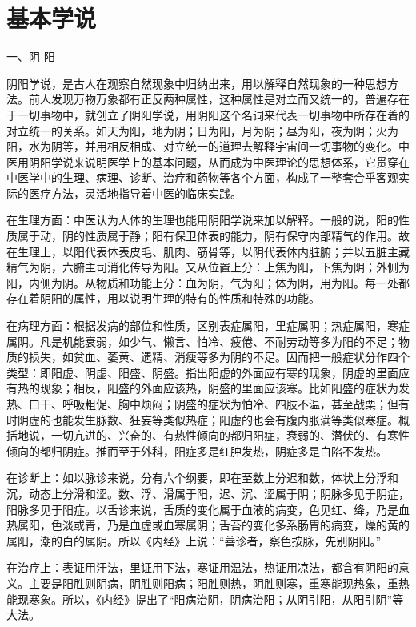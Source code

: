 \documentclass[a4paper,12pt,UTF8,twoside]{ctexbook}
\begin{document}
\section{基本学说}

一、阴 阳

阴阳学说，是古人在观察自然现象中归纳出来，用以解释自然现象的一种思想方法。前人发现万物万象都有正反两种属性，这种属性是对立而又统一的，普遍存在于一切事物中，就创立了阴阳学说，用阴阳这个名词来代表一切事物中所存在着的对立统一的关系。如天为阳，地为阴；日为阳，月为阴；昼为阳，夜为阴；火为阳，水为阴等，并用相反相成、对立统一的道理去解释宇宙间一切事物的变化。中医用阴阳学说来说明医学上的基本问题，从而成为中医理论的思想体系，它贯穿在中医学中的生理、病理、诊断、治疗和药物等各个方面，构成了一整套合乎客观实际的医疗方法，灵活地指导着中医的临床实践。

在生理方面：中医认为人体的生理也能用阴阳学说来加以解释。一般的说，阳的性质属于动，阴的性质属于静；阳有保卫体表的能力，阴有保守内部精气的作用。故在生理上，以阳代表体表皮毛、肌肉、筋骨等，以阴代表体内脏腑；并以五脏主藏精气为阴，六腑主司消化传导为阳。又从位置上分：上焦为阳，下焦为阴；外侧为阳，内侧为阴。从物质和功能上分：血为阴，气为阳；体为阴，用为阳。每一处都存在着阴阳的属性，用以说明生理的特有的性质和特殊的功能。

在病理方面：根据发病的部位和性质，区别表症属阳，里症属阴；热症属阳，寒症属阴。凡是机能衰弱，如少气、懒言、怕冷、疲倦、不耐劳动等多为阳的不足；物质的损失，如贫血、萎黄、遗精、消瘦等多为阴的不足。因而把一般症状分作四个类型：即阳虚、阴虚、阳盛、阴盛。指出阳虚的外面应有寒的现象，阴虚的里面应有热的现象；相反，阳盛的外面应该热，阴盛的里面应该寒。比如阳盛的症状为发热、口干、呼吸粗促、胸中烦闷；阴盛的症状为怕冷、四肢不温，甚至战栗；但有时阴虚的也能发生脉数、狂妄等类似热症；阳虚的也会有腹内胀满等类似寒症。概括地说，一切亢进的、兴奋的、有热性倾向的都归阳症，衰弱的、潜伏的、有寒性倾向的都归阴症。推而至于外科，阳症多是红肿发热，阴症多是白陷不发热。

在诊断上：如以脉诊来说，分有六个纲要，即在至数上分迟和数，体状上分浮和沉，动态上分滑和涩。数、浮、滑属于阳，迟、沉、涩属于阴；阴脉多见于阴症，阳脉多见于阳症。以舌诊来说，舌质的变化属于血液的病变，色见红、绛，乃是血热属阳，色淡或青，乃是血虚或血寒属阴；舌苔的变化多系肠胃的病变，燥的黄的属阳，潮的白的属阴。所以《内经》上说：“善诊者，察色按脉，先别阴阳。”

在治疗上：表证用汗法，里证用下法，寒证用温法，热证用凉法，都含有阴阳的意义。主要是阳胜则阴病，阴胜则阳病；阳胜则热，阴胜则寒，重寒能现热象，重热能现寒象。所以，《内经》提出了“阳病治阴，阴病治阳；从阴引阳，从阳引阴”等大法。
\end{document}
